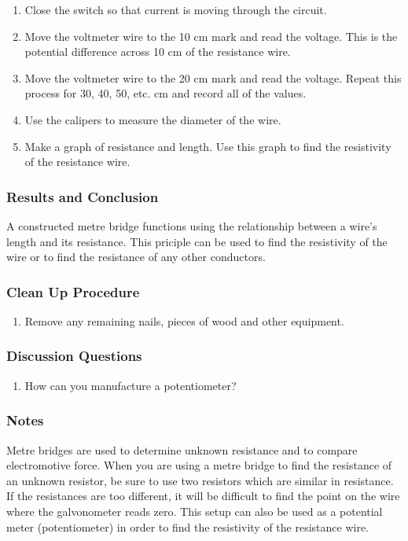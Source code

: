 \begin{enumerate}
\item{Close the switch so that current is moving through the circuit.} 
\item{Move the voltmeter wire to the 10 cm mark and read the voltage. This is the potential difference across 10 cm of the resistance wire.} 
\item{Move the voltmeter wire to the 20 cm mark and read the voltage. Repeat this process for 30, 40, 50, etc. cm and record all of the values.} 
\item{Use the calipers to measure the diameter of the wire.} 
\item{Make a graph of resistance and length. Use this graph to find the resistivity of the resistance wire.} 
\end{enumerate}

\subsubsection*{Results and Conclusion}
A constructed metre bridge functions using the relationship between a wire's length and its resistance. This priciple can be used to find the resistivity of the wire or to find the resistance of any other conductors.  

\subsubsection*{Clean Up Procedure}
\begin{enumerate}
\item{Remove any remaining nails, pieces of wood and other equipment.} 
\end{enumerate}

\subsubsection*{Discussion Questions}
\begin{enumerate}
\item{How can you manufacture a potentiometer?}
\end{enumerate}

\subsubsection*{Notes}
Metre bridges are used to determine unknown resistance and to compare electromotive force.  When you are using a metre bridge to find the resistance of an unknown resistor, be sure to use two resistors which are similar in resistance.  If the resistances are too different, it will be difficult to find the point on the wire where the galvonometer reads zero.
This setup can also be used as a potential meter (potentiometer) in order to find the resistivity of the resistance wire.  

